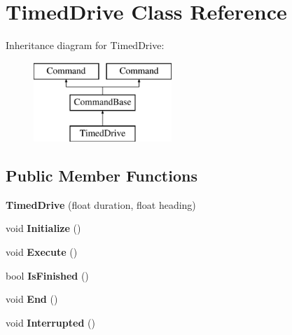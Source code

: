 \hypertarget{class_timed_drive}{}\section{Timed\+Drive Class Reference}
\label{class_timed_drive}
Inheritance diagram for Timed\+Drive\+:\begin{figure}[H]
\begin{center}
\leavevmode
\includegraphics[height=3.000000cm]{class_timed_drive}
\end{center}
\end{figure}
\subsection*{Public Member Functions}
\begin{DoxyCompactItemize}
\item 
\hypertarget{class_timed_drive_a056192c806f771b28d1059b6a32426a0}{}{\bfseries Timed\+Drive} (float duration, float heading)\label{class_timed_drive_a056192c806f771b28d1059b6a32426a0}

\item 
\hypertarget{class_timed_drive_ab7f07fe627966c0b53e3b4b627e476a1}{}void {\bfseries Initialize} ()\label{class_timed_drive_ab7f07fe627966c0b53e3b4b627e476a1}

\item 
\hypertarget{class_timed_drive_adede6a8f93c102aaff6335c7a470028a}{}void {\bfseries Execute} ()\label{class_timed_drive_adede6a8f93c102aaff6335c7a470028a}

\item 
\hypertarget{class_timed_drive_a1b06b3bce24a28d879f927502745dc1a}{}bool {\bfseries Is\+Finished} ()\label{class_timed_drive_a1b06b3bce24a28d879f927502745dc1a}

\item 
\hypertarget{class_timed_drive_a8178e8a9c7f372c9f17276e8279fba92}{}void {\bfseries End} ()\label{class_timed_drive_a8178e8a9c7f372c9f17276e8279fba92}

\item 
\hypertarget{class_timed_drive_af74f16cab8a8081a0940b5bd7566a99e}{}void {\bfseries Interrupted} ()\label{class_timed_drive_af74f16cab8a8081a0940b5bd7566a99e}

\end{DoxyCompactItemize}
